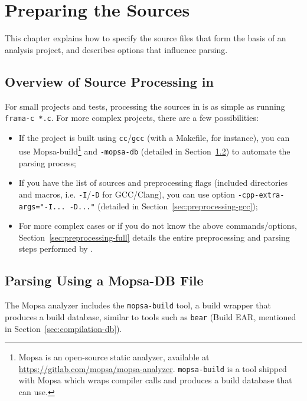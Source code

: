 \chapter{Preparing the Sources}
\label{user-sources}

This chapter explains how to specify the source files that form the
basis of an analysis project, and describes options that influence parsing.

\section{Overview of Source Processing in \FramaC}\label{sec:overview}

For small projects and tests, processing the sources in \FramaC is as simple
as running \texttt{frama-c *.c}. For more complex projects, there are a few
possibilities:

\begin{itemize}
\item If the project is built using \texttt{cc}/\texttt{gcc} (with a Makefile,
  for instance), you can use Mopsa-build\footnote{\textsf{Mopsa} is an
  open-source static analyzer, available at
  \url{https://gitlab.com/mopsa/mopsa-analyzer}. \texttt{mopsa-build} is a tool
  shipped with Mopsa which wraps compiler calls and produces a build
  database that \FramaC can use.} and \texttt{-mopsa-db}
  (detailed in Section~\ref{sec:mopsa}) to automate the parsing process;
\item If you have the list of sources and preprocessing flags
  (included directories and macros, i.e. \texttt{-I}/\texttt{-D} for
  GCC/Clang), you can use option \verb|-cpp-extra-args="-I... -D..."|
  (detailed in Section~\ref{sec:preprocessing-gcc});
\item For more complex cases or if you do not know the above
  commands/options, Section~\ref{sec:preprocessing-full} details the
  entire preprocessing and parsing steps performed by \FramaC.
\end{itemize}

\section{Parsing Using a Mopsa-DB File}\label{sec:mopsa}

The \textsf{Mopsa} analyzer includes the \texttt{mopsa-build} tool, a build
wrapper that produces a build database, similar to tools such as \texttt{bear}
(Build EAR, mentioned in Section~\ref{sec:compilation-db}).

